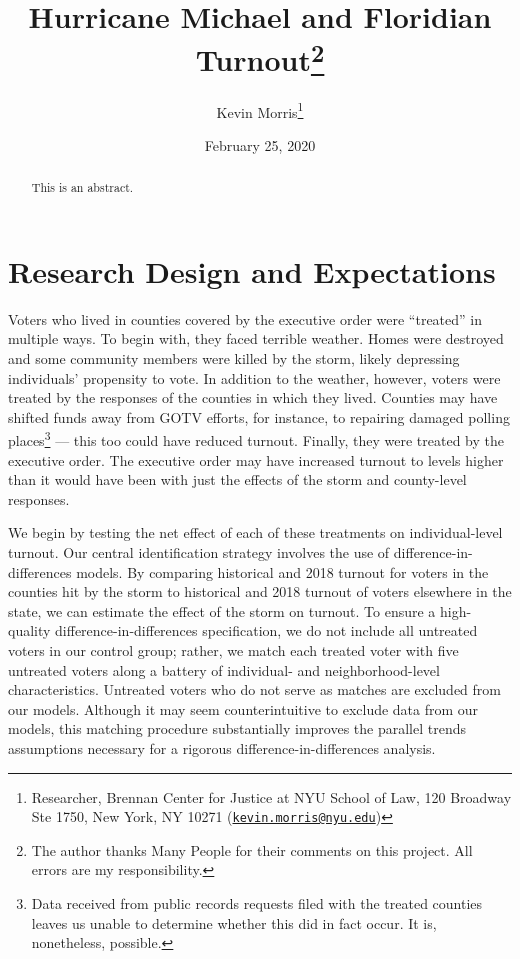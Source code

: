 \documentclass[
  12pt,
]{article}
\title{Hurricane Michael and Floridian Turnout\thanks{The author thanks Many People for their comments on this project. All errors are my responsibility.}}
\author{Kevin Morris\footnote{Researcher, Brennan Center for Justice at NYU School of Law, 120 Broadway Ste 1750, New York, NY 10271 (\href{mailto:kevin.morris@nyu.edu}{\nolinkurl{kevin.morris@nyu.edu}})}}
\date{February 25, 2020}
\begin{document}
\maketitle
\begin{abstract}
This is an abstract.
\end{abstract}

\pagebreak


\hypertarget{research-design-and-expectations}{%
\section*{Research Design and Expectations}\label{research-design-and-expectations}}

Voters who lived in counties covered by the executive order were ``treated'' in multiple ways. To begin with, they faced terrible weather. Homes were destroyed and some community members were killed by the storm, likely depressing individuals' propensity to vote. In addition to the weather, however, voters were treated by the responses of the counties in which they lived. Counties may have shifted funds away from GOTV efforts, for instance, to repairing damaged polling places\footnote{Data received from public records requests filed with the treated counties leaves us unable to determine whether this did in fact occur. It is, nonetheless, possible.} --- this too could have reduced turnout. Finally, they were treated by the executive order. The executive order may have increased turnout to levels higher than it would have been with just the effects of the storm and county-level responses.

We begin by testing the net effect of each of these treatments on individual-level turnout. Our central identification strategy involves the use of difference-in-differences models. By comparing historical and 2018 turnout for voters in the counties hit by the storm to historical and 2018 turnout of voters elsewhere in the state, we can estimate the effect of the storm on turnout. To ensure a high-quality difference-in-differences specification, we do not include all untreated voters in our control group; rather, we match each treated voter with five untreated voters along a battery of individual- and neighborhood-level characteristics. Untreated voters who do not serve as matches are excluded from our models. Although it may seem counterintuitive to exclude data from our models, this matching procedure substantially improves the parallel trends assumptions necessary for a rigorous difference-in-differences analysis.
\end{document}
